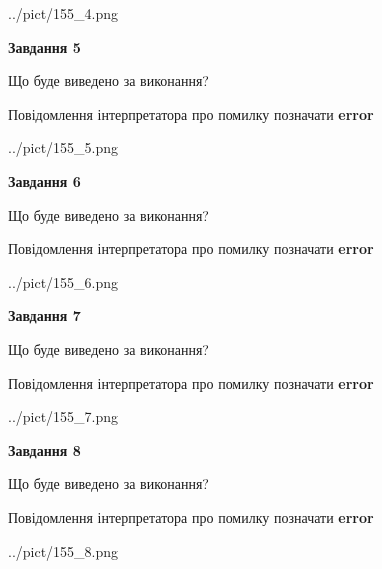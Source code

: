 \documentclass[12pt, ukrainian]{article}
\begin{document}
{\begin{center}
	{../pict/155_4.png}
\end{center}
\newpage

{\begin {center}\textbf{Завдання 5}\end {center}}\par
Що буде виведено за виконання? \par
Повідомлення інтерпретатора про помилку позначати \textbf{error}

\begin{center}
	{../pict/155_5.png}
\end{center}
\newpage

{\begin {center}\textbf{Завдання 6}\end {center}}\par
Що буде виведено за виконання? \par
Повідомлення інтерпретатора про помилку позначати \textbf{error}

\begin{center}
	{../pict/155_6.png}
\end{center}
\newpage

{\begin {center}\textbf{Завдання 7}\end {center}}\par
Що буде виведено за виконання? \par
Повідомлення інтерпретатора про помилку позначати \textbf{error}

\begin{center}
	{../pict/155_7.png}
\end{center}
\newpage

{\begin {center}\textbf{Завдання 8}\end {center}}\par
Що буде виведено за виконання? \par
Повідомлення інтерпретатора про помилку позначати \textbf{error}

\begin{center}
	{../pict/155_8.png}
\end{center}
\newpage

}
\end{document}
